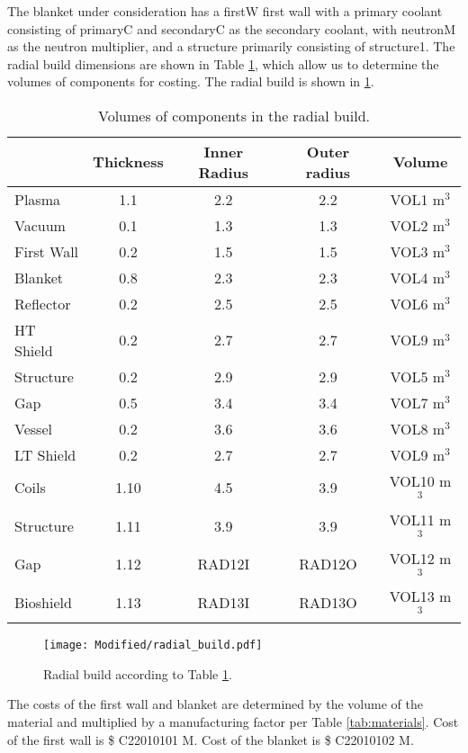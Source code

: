 The blanket under consideration has a firstW first wall with a primary coolant consisting of primaryC and secondaryC as the secondary coolant, with neutronM as the neutron multiplier, and a structure primarily consisting of structure1. The radial build dimensions are shown in Table \ref{tab:volumes}, which allow us to determine the volumes of components for costing.  The radial build is shown in \ref{fig:radial}.  \\


\begin{table}[h!]
    \centering
    \begin{tabular}{l c  c c c}
    \hline
        &	Thickness	&	Inner Radius	&	Outer radius	&	Volume		\\
        \hline
Plasma	&	1.1	&	2.2	&	2.2	&	VOL1	m$^{3}$	\\
Vacuum	&	0.1	&	1.3	&	1.3	&	VOL2	m$^{3}$	\\
First Wall	&	0.2	&	1.5	&	1.5	&	VOL3	m$^{3}$	\\
Blanket	&	0.8	&	2.3	&	2.3	&	VOL4	m$^{3}$	\\
Reflector	&	0.2	&	2.5	&	2.5	&	VOL6	m$^{3}$	\\
HT Shield	&	0.2	&	2.7	&	2.7	&	VOL9	m$^{3}$	\\
Structure	&	0.2	&	2.9	&	2.9	&	VOL5	m$^{3}$	\\
Gap	&	0.5	&	3.4	&	3.4	&	VOL7	m$^{3}$	\\
Vessel	&	0.2	&	3.6	&	3.6	&	VOL8	m$^{3}$	\\
LT Shield	&	0.2	&	2.7	&	2.7	&	VOL9	m$^{3}$	\\
Coils	&	1.10	&	4.5	&	3.9	&	VOL10	m$^{3}$	\\
Structure	&	1.11	&	3.9	&	3.9	&	VOL11	m$^{3}$	\\
Gap	&	1.12	&	RAD12I	&	RAD12O	&	VOL12	m$^{3}$	\\
Bioshield	&	1.13	&	RAD13I	&	RAD13O	&	VOL13	m$^{3}$	\\

        \hline
    \end{tabular}
    \caption{Volumes of components in the radial build.}
    \label{tab:volumes}
\end{table}

\begin{figure}
    \centering
    \texttt{[image: Modified/radial\_build.pdf]}
    \caption{Radial build according to Table \ref{tab:volumes}.}
    \label{fig:radial}
\end{figure}



The costs of the first wall and blanket are determined by the volume of the material and multiplied by a manufacturing factor per Table \ref{tab:materials}.   Cost of the first wall is \$ C22010101 M.  Cost of the blanket is \$ C22010102 M.

